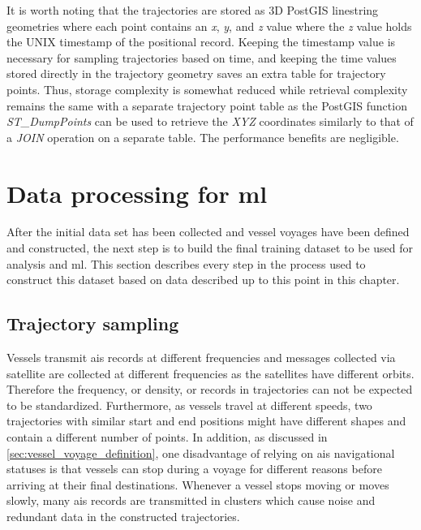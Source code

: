 It is worth noting that the trajectories are stored as 3D PostGIS linestring geometries where each point contains an \textit{x}, \textit{y}, and \textit{z} value where the \textit{z} value holds the UNIX timestamp of the positional record. Keeping the timestamp value is necessary for sampling trajectories based on time, and keeping the time values stored directly in the trajectory geometry saves an extra table for trajectory points. Thus, storage complexity is somewhat reduced while retrieval complexity remains the same with a separate trajectory point table as the PostGIS function \textit{ST\_DumpPoints} can be used to retrieve the \textit{XYZ} coordinates similarly to that of a \textit{JOIN} operation on a separate table. The performance benefits are negligible.

\section{Data processing for \acrfull{ml}}

After the initial data set has been collected and vessel voyages have been defined and constructed, the next step is to build the final training dataset to be used for analysis and \acrfull{ml}. This section describes every step in the process used to construct this dataset based on data described up to this point in this chapter.

\subsection{Trajectory sampling}
\label{sec:trajectory_sampling}

Vessels transmit \acrshort{ais} records at different frequencies and messages collected via satellite are collected at different frequencies as the satellites have different orbits. Therefore the frequency, or density, or records in trajectories can not be expected to be standardized. Furthermore, as vessels travel at different speeds, two trajectories with similar start and end positions might have different shapes and contain a different number of points. In addition, as discussed in \cref{sec:vessel_voyage_definition}, one disadvantage of relying on \acrshort{ais} navigational statuses is that vessels can stop during a voyage for different reasons before arriving at their final destinations. Whenever a vessel stops moving or moves slowly, many \acrshort{ais} records are transmitted in clusters which cause noise and redundant data in the constructed trajectories.

